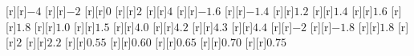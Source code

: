 \begin{psfrags}
%
[r][r]{$-4$}%
[r][r]{$-2$}%
[r][r]{$0$}%
[r][r]{$2$}%
[r][r]{$4$}%
[r][r]{$-1.6$}%
[r][r]{$-1.4$}%
[r][r]{$1.2$}%
[r][r]{$1.4$}%
[r][r]{$1.6$}%
[r][r]{$1.8$}%
[r][r]{$1.0$}%
[r][r]{$1.5$}%
[r][r]{$4.0$}%
[r][r]{$4.2$}%
[r][r]{$4.3$}%
[r][r]{$4.4$}%
[r][r]{$-2$}%
[r][r]{$-1.8$}%
[r][r]{$1.8$}%
[r][r]{$2$}%
[r][r]{$2.2$}%
[r][r]{$0.55$}%
[r][r]{$0.60$}%
[r][r]{$0.65$}%
[r][r]{$0.70$}%
[r][r]{$0.75$}%
%
%
\end{psfrags}%
%
